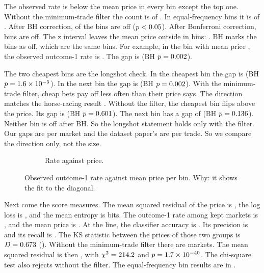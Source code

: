 The observed rate is below the mean price in every bin except the top one.
Without the minimum-trade filter the count is \GapNegBinsNoMin{} of \GapBinsTotal.
In equal-frequency bins it is \GapNegBinsEqFreq{} of \GapBinsTotal.
After BH correction, \QOneBinsBh{} of the \NBins{} bins are off ($p<0.05$).
After Bonferroni correction, \QOneBinsBonferroni{} bins are off.
The \CiLevel{} z interval leaves the mean price outside in \ZIntervalBinsOutsideN{} bins: \ZIntervalBinsOutsideList.
BH marks the bins \ZIntervalBinsBhOffList{} as off, which are the same bins.
For example, in the bin with mean price \BinSeventyEightyPrice{}, the observed outcome-1 rate is \BinSeventyEightyObs.
The gap is \BinSeventyEightyDiff{} (BH $p=0.002$).

The two cheapest bins are the longshot check.
In the cheapest bin the gap is \BinZeroTenDiff{} (BH $p=1.6\times10^{-5}$).
In the next bin the gap is \BinTenTwentyDiff{} (BH $p=0.002$).
With the minimum-trade filter, cheap bets pay off less often than their price says.
The direction matches the horse-racing result \citep{snowberg2010favorite}.
Without the filter, the cheapest bin flips above the price.
Its gap is \NoMinBinZeroDiff{} (BH $p=0.601$).
The next bin has a gap of \NoMinBinOneDiff{} (BH $p=0.136$).
Neither bin is off after BH.
So the longshot statement holds only with the filter.
Our gaps are per market and the dataset paper's are per trade.
So we compare the direction only, not the size.


\begin{figure}[H]
\centering
\begin{subfigure}{\linewidth}\centering
{}
\caption{Rate against price.}
\label{fig:calib-rate}
\end{subfigure}
\caption{Observed outcome-1 rate against mean price per bin. Why: it shows the fit to the diagonal.}%
\label{fig:calib}
\end{figure}

Next come the score measures.
The mean squared residual of the price is \QOneBrier, the log loss is \QOneLogLoss, and the mean entropy is \QOneEntropy{} bits.
The outcome-1 rate among kept markets is \QOneYesRate, and the mean price is \PriceOneDayMean.
At the \FavoriteLine{} line, the classifier accuracy is \QOneAccuracy.
Its precision is \QOnePrecision{} and its recall is \QOneRecall.
The KS statistic between the prices of those two groups is $D=0.673$ ().
Without the minimum-trade filter there are \QOneNoMinN{} markets.
The mean squared residual is then \QOneNoMinBrier{}, with $\chi^2=214.2$ and $p=1.7\times10^{-40}$.
The chi-square test also rejects without the filter.
The equal-frequency bin results are in .

